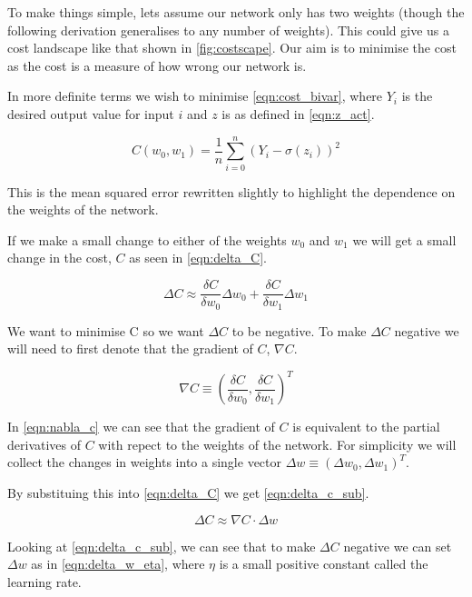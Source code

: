To make things simple, lets assume our network only has two weights (though the following derivation generalises to any number of weights). This could give us a cost landscape like that shown in \autoref{fig:costscape}. Our aim is to minimise the cost as the cost is a measure of how wrong our network is.

In more definite terms we wish to minimise \autoref{eqn:cost_bivar}, where $Y_i$ is the desired output value for input $i$ and $z$ is as defined in \autoref{eqn:z_act}.

\begin{equation} \label{eqn:cost_bivar}
C(w_0, w_1) = \frac{1}{n}\sum_{i=0}^{n} (Y_i - \sigma(z_i))^2
\end{equation}

This is the mean squared error rewritten slightly to highlight the dependence on the weights of the network.

If we make a small change to either of the weights $w_0$ and $w_1$ we will get a small change in the cost, $C$ as seen in \autoref{eqn:delta_C}.

\begin{equation} \label{eqn:delta_C}
\Delta C \approx \frac{\delta C}{\delta w_0} \Delta w_0 + \frac{\delta C}{\delta w_1} \Delta w_1
\end{equation}

We want to minimise C so we want $\Delta C$ to be negative. To make $\Delta C$ negative we will need to first denote that the gradient of $C$, $\nabla C$. 

\begin{equation} \label{eqn:nabla_c}
\nabla C \equiv (\frac{\delta C}{\delta w_0}, \frac{\delta C}{\delta w_1})^T
\end{equation}

In \autoref{eqn:nabla_c} we can see that the gradient of $C$ is equivalent to the partial derivatives of $C$ with repect to the weights of the network. For simplicity we will collect the changes in weights into a single vector $\Delta w \equiv (\Delta w_0, \Delta w_1)^T$.

By substituing this into \autoref{eqn:delta_C} we get \autoref{eqn:delta_c_sub}.

\begin{equation} \label{eqn:delta_c_sub}
\Delta C \approx \nabla C \cdot \Delta w 
\end{equation}

Looking at \autoref{eqn:delta_c_sub}, we can see that to make $\Delta C$ negative we can set $\Delta w$ as in \autoref{eqn:delta_w_eta}, where $\eta$ is a small positive constant called the learning rate.

